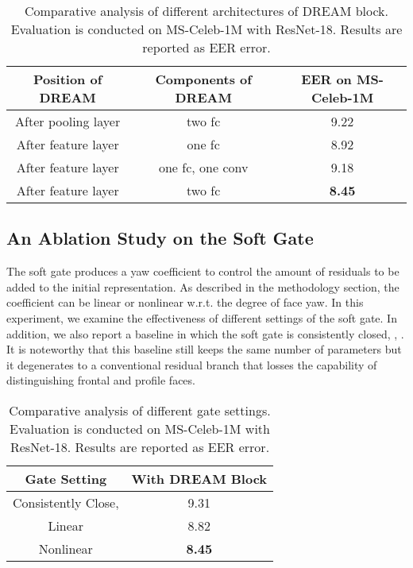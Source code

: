 \documentclass[10pt,twocolumn,letterpaper]{article}
\begin{document}
\begin{table}[t]
\footnotesize
\caption{Comparative analysis of different architectures of DREAM block. Evaluation is conducted on MS-Celeb-1M with ResNet-18. Results are reported as EER error.}
\vskip 0.1cm
\begin{adjustbox}{width=1\linewidth}
\begin{tabular}{c|c|c}
   \hline
  Position of DREAM &  Components of DREAM & EER on MS-Celeb-1M \\
  \hline\hline
  After pooling layer &  two fc & 9.22   \\
  After feature layer &    one fc     &   8.92      \\ 
  After feature layer & one fc, one conv  & 9.18      \\
  After feature layer & two fc      & \textbf{8.45}  \\
  \hline
 \end{tabular}
 \end{adjustbox}
\label{tab:dreamBlockStructure}
\vskip -0.1cm
\end{table}


\subsection{An Ablation Study on the Soft Gate}


The soft gate produces a yaw coefficient to control the amount of residuals to be added to the initial representation. As described in the methodology section, the coefficient can be linear or nonlinear w.r.t. the degree of face yaw. In this experiment, we examine the effectiveness of different settings of the soft gate. 
In addition, we also report a baseline in which the soft gate is consistently closed, \eg, . It is noteworthy that this baseline still keeps the same number of parameters but it degenerates to a conventional residual branch that losses the capability of distinguishing frontal and profile faces. 



\begin{table}[t]
\footnotesize
\vskip 0.1cm
\centering
\caption{Comparative analysis of different gate settings. Evaluation is conducted on MS-Celeb-1M with ResNet-18. Results are reported as EER error.}
\vskip 0.1cm
\begin{tabular}{c|c}
   \hline
  Gate Setting &  With DREAM Block  \\
  \hline\hline
  Consistently Close,  & 9.31      \\
  Linear & 8.82      \\ 
  Nonlinear & \textbf{8.45}      \\ 
  \hline
 \end{tabular}
\label{tab:celebReserve}
\vskip -0.2cm
\end{table}
\end{document}

